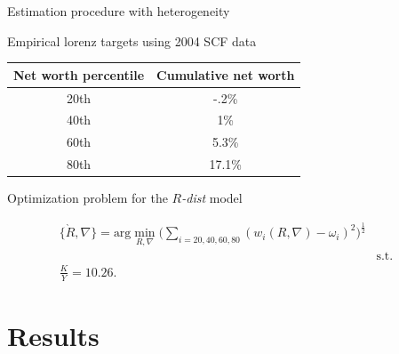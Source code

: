 \documentclass{beamer}
\begin{document}
\begin{frame}{Estimation procedure with heterogeneity}

\small
\par Empirical lorenz targets using 2004 SCF data \vspace{2mm}

\centering
\begin{tabular}{|c|c|}
\hline
Net worth percentile & Cumulative net worth \\
\hline
20th & -.2\%  \\
40th &  1\% \\
60th &  5.3\% \\
80th &  17.1\% \\
\hline
\end{tabular}

\begin{flushleft}
\par Optimization problem for the $R$\textit{-dist} model 
\end{flushleft}

\vspace{-7.5mm}
 \begin{eqnarray*}
  \{\grave{R}, \nabla\} = \text{arg}\min_{R, \nabla} \bigg( \sum_{i=20, 40, 60, 80} (w_{i}(R, \nabla)-\omega_i )^{2} \bigg)^{\frac{1}{2}}\\
  &\text{s.t.}& \\
  \frac{K}{Y} = 10.26. %
\end{eqnarray*}


\end{frame}

\section{Results}
\end{document}
